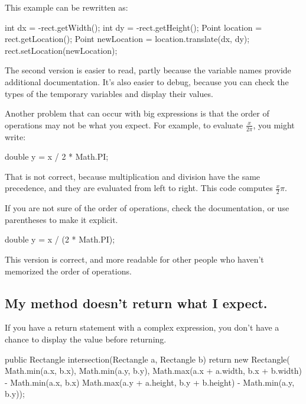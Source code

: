 \documentclass[12pt]{book}
\theoremstyle{exercise}
\begin{document}
This example can be rewritten as:

\begin{code}
int dx = -rect.getWidth();
int dy = -rect.getHeight();
Point location = rect.getLocation();
Point newLocation = location.translate(dx, dy);
rect.setLocation(newLocation);
\end{code}

The second version is easier to read, partly because the variable names provide additional documentation.
It's also easier to debug, because you can check the types of the temporary variables and display their values.


Another problem that can occur with big expressions is that the order of operations may not be what you expect.
For example, to evaluate $\frac{x}{2 \pi}$, you might write:

\begin{code}
double y = x / 2 * Math.PI;
\end{code}

That is not correct, because multiplication and division have the same precedence, and they are evaluated from left to right.
This code computes $\frac{x}{2}\pi$.

If you are not sure of the order of operations, check the documentation, or use parentheses to make it explicit.

\begin{code}
double y = x / (2 * Math.PI);
\end{code}

This version is correct, and more readable for other people who haven't memorized the order of operations.


\subsection*{My method doesn't return what I expect.}


If you have a return statement with a complex expression, you don't have a chance to display the value before returning.

\begin{code}
public Rectangle intersection(Rectangle a, Rectangle b) {
    return new Rectangle(
        Math.min(a.x, b.x), Math.min(a.y, b.y),
        Math.max(a.x + a.width, b.x + b.width)
            - Math.min(a.x, b.x)
        Math.max(a.y + a.height, b.y + b.height)
            - Math.min(a.y, b.y));
}
\end{code}
\end{document}
